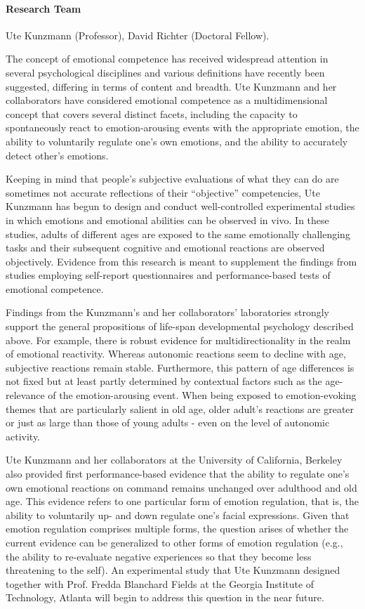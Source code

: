 
\paragraph{Research Team}
Ute Kunzmann (Professor), David Richter (Doctoral Fellow).

 The concept of emotional competence has received widespread attention in several psychological disciplines and various definitions have recently been suggested, differing in terms of content and breadth. Ute Kunzmann and her collaborators have considered emotional competence as a multidimensional concept that covers several distinct facets, including the capacity to spontaneously react to emotion-arousing events with the appropriate emotion, the ability to voluntarily regulate one's own emotions, and the ability to accurately detect other's emotions.
 
 Keeping in mind that people's subjective evaluations of what they can do are sometimes not accurate reflections of their ``objective'' competencies, Ute Kunzmann has begun to design and conduct well-controlled experimental studies in which emotions and emotional abilities can be observed in vivo. In these studies, adults of different ages are exposed to the same emotionally challenging tasks and their subsequent cognitive and emotional reactions are observed objectively. Evidence from this research is meant to supplement the findings from studies employing self-report questionnaires and performance-based tests of emotional competence. 

Findings from the Kunzmann's and her collaborators' laboratories strongly support the general propositions of life-span developmental psychology described above. For example, there is robust evidence for multidirectionality in the realm of emotional reactivity. Whereas autonomic reactions seem to decline with age, subjective reactions remain stable. Furthermore, this pattern of age differences is not fixed but at least partly determined by contextual factors such as the age-relevance of the emotion-arousing event. When being exposed to emotion-evoking themes that are particularly salient in old age, older adult's reactions are greater or just as large than those of young adults - even on the level of autonomic activity.  

Ute Kunzmann and her collaborators at the University of California, Berkeley also provided first performance-based evidence that the ability to regulate one's own emotional reactions on command remains unchanged over adulthood and old age. This evidence refers to one particular form of emotion regulation, that is, the ability to voluntarily up- and down regulate one's facial expressions. Given that emotion regulation comprises multiple forms, the question arises of whether the current evidence can be generalized to other forms of emotion regulation (e.g., the ability to re-evaluate negative experiences so that they become less threatening to the self). An experimental study that Ute Kunzmann designed together with Prof. Fredda Blanchard Fields at the Georgia Institute of Technology, Atlanta will begin to address this question in the near future.

